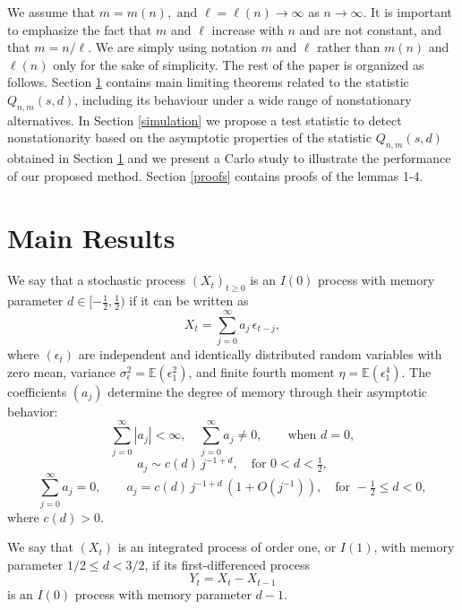 \documentclass[12pt]{article}
\begin{document}
We assume that $m=m(n),\textrm{ and } \ell=\ell(n)\to\infty$ as $n\to\infty$. It is  important to emphasize the fact that $m$ and $\ell$ increase with $n$ and are not constant, and that $m=n/\ell$.
We are simply using notation $m$ and $\ell$ rather than $m(n)$ and
$\ell(n)$ only for the sake of simplicity. 
The rest of the paper is organized as follows. 
Section \ref{sec:2} contains main limiting theorems related to the statistic $Q_{n,m}(s,d)$, including its behaviour under a wide range of nonstationary alternatives. 
In Section \ref{simulation} we propose a  test statistic to detect nonstationarity  based on the asymptotic properties of the statistic $Q_{n,m}(s,d)$ obtained in  Section \ref{sec:2} and we present a Carlo study  to illustrate the performance of our proposed method.  
Section \ref{proofs} contains   proofs of the lemmas 1-4.
\section{Main Results}\label{sec:2}

We say that a stochastic process \((X_t)_{t \ge 0}\) is an \(I(0)\) process with memory parameter \(d \in [-\tfrac{1}{2}, \tfrac{1}{2})\) if it can be written as  
\begin{equation}\label{linear}
X_t = \sum_{j=0}^\infty a_j\, \epsilon_{t-j},
\end{equation}
where \((\epsilon_t)\) are independent and identically distributed random variables with zero mean, variance \(\sigma_\epsilon^2 = \mathbb{E}(\epsilon_1^2)\), and finite fourth moment \(\eta = \mathbb{E}(\epsilon_1^4)\). 
The coefficients \((a_j)\) determine the degree of memory through their asymptotic behavior:
\begin{equation}\label{summable}
\sum_{j=0}^\infty |a_j| < \infty, \quad \sum_{j=0}^\infty a_j\neq0,\qquad\text{when } d = 0,
\end{equation}
\begin{equation}\label{positived}
a_j \sim c(d)\, j^{-1+d}, \quad \text{for } 0 < d < \tfrac{1}{2},
\end{equation}
\begin{equation}\label{negatived1}
\sum_{j=0}^\infty a_j = 0, \qquad 
a_j = c(d)\, j^{-1+d}\,(1 + O(j^{-1})), \quad \text{for } -\tfrac{1}{2} \le d < 0,
\end{equation}
where \(c(d) > 0\).  

We say that \((X_t)\) is an integrated process of order one, or \(I(1)\), with memory parameter \(1/2 \le d < 3/2\), if its first-differenced process
\[
Y_t = X_t - X_{t-1}
\]
is an \(I(0)\) process with memory parameter \(d - 1\).
\end{document}

